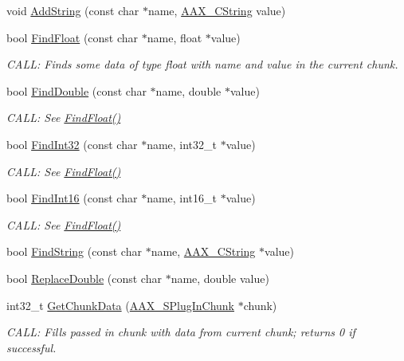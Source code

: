 \begin{DoxyCompactItemize}
void \hyperlink{a00014_a8a06f076c8e1c93df9348857abf50e39}{Add\+String} (const char $\ast$name, \hyperlink{a00042}{A\+A\+X\+\_\+\+C\+String} value)
\item 
bool \hyperlink{a00014_a0651792f378318532e5be3799b108e58}{Find\+Float} (const char $\ast$name, float $\ast$value)
\begin{DoxyCompactList}\small\item\em C\+A\+L\+L\+: Finds some data of type float with {\itshape name} and {\itshape value} in the current chunk. \end{DoxyCompactList}\item 
bool \hyperlink{a00014_ac853da85bf797172a8bc3db5bcf98e66}{Find\+Double} (const char $\ast$name, double $\ast$value)
\begin{DoxyCompactList}\small\item\em C\+A\+L\+L\+: See \hyperlink{a00014_a0651792f378318532e5be3799b108e58}{Find\+Float()} \end{DoxyCompactList}\item 
bool \hyperlink{a00014_ad6bbac0856350d4d1734cb7de594149a}{Find\+Int32} (const char $\ast$name, int32\+\_\+t $\ast$value)
\begin{DoxyCompactList}\small\item\em C\+A\+L\+L\+: See \hyperlink{a00014_a0651792f378318532e5be3799b108e58}{Find\+Float()} \end{DoxyCompactList}\item 
bool \hyperlink{a00014_aaa004cdaafabb16caf7c0bad7e71db8f}{Find\+Int16} (const char $\ast$name, int16\+\_\+t $\ast$value)
\begin{DoxyCompactList}\small\item\em C\+A\+L\+L\+: See \hyperlink{a00014_a0651792f378318532e5be3799b108e58}{Find\+Float()} \end{DoxyCompactList}\item 
bool \hyperlink{a00014_a4272b40bb46bb54c0083d7313b3d73f7}{Find\+String} (const char $\ast$name, \hyperlink{a00042}{A\+A\+X\+\_\+\+C\+String} $\ast$value)
\item 
bool \hyperlink{a00014_af394b04f20c198396c4a4090bdeff06c}{Replace\+Double} (const char $\ast$name, double value)
\item 
int32\+\_\+t \hyperlink{a00014_a7cc4e0325d71d6957cdd10c1eaf5d8bc}{Get\+Chunk\+Data} (\hyperlink{a00125}{A\+A\+X\+\_\+\+S\+Plug\+In\+Chunk} $\ast$chunk)
\begin{DoxyCompactList}\small\item\em C\+A\+L\+L\+: Fills passed in {\itshape chunk} with data from current chunk; returns 0 if successful. \end{DoxyCompactList}\item 

\end{DoxyCompactItemize}
